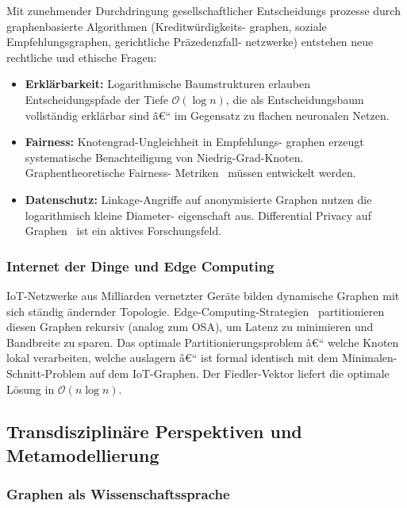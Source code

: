 ﻿\documentclass[12pt,a4paper,twoside]{article}
\theoremstyle{definition}
\theoremstyle{plain}
\theoremstyle{remark}
\begin{document}
Mit zunehmender Durchdringung gesellschaftlicher Entscheidungs\-
prozesse durch graphenbasierte Algorithmen (Kreditwürdigkeits-
graphen, soziale Empfehlungsgraphen, gerichtliche Präzedenzfall-
netzwerke) entstehen neue rechtliche und ethische Fragen:
\begin{itemize}
  \item \textbf{Erklärbarkeit:} Logarithmische Baumstrukturen
        erlauben Entscheidungspfade der Tiefe $\mathcal{O}(\log n)$,
        die als Entscheidungsbaum vollständig erklärbar sind â€“
        im Gegensatz zu flachen neuronalen Netzen.
  \item \textbf{Fairness:} Knotengrad-Ungleichheit in Empfehlungs-
        graphen erzeugt systematische Benachteiligung von
        Niedrig-Grad-Knoten.  Graphentheoretische Fairness-
        Metriken~\cite{Saxena2022} müssen entwickelt werden.
  \item \textbf{Datenschutz:} Linkage-Angriffe auf anonymisierte
        Graphen nutzen die logarithmisch kleine Diameter-
        eigenschaft aus.  Differential Privacy auf Graphen~\cite{Hay2009}
        ist ein aktives Forschungsfeld.
\end{itemize}

\subsubsection{Internet der Dinge und Edge Computing}

IoT-Netzwerke aus Milliarden vernetzter Geräte bilden
dynamische Graphen mit sich ständig ändernder Topologie.
Edge-Computing-Strategien~\cite{Shi2016} partitionieren
diesen Graphen rekursiv (analog zum OSA), um Latenz zu
minimieren und Bandbreite zu sparen.  Das optimale
Partitionierungsproblem â€“ welche Knoten lokal verarbeiten,
welche auslagern â€“ ist formal identisch mit dem
Minimalen-Schnitt-Problem auf dem IoT-Graphen.
Der Fiedler-Vektor liefert die optimale Lösung in
$\mathcal{O}(n \log n)$.

\subsection{Transdisziplinäre Perspektiven und Metamodellierung}
\label{sub:meta}

\subsubsection{Graphen als Wissenschaftssprache}
\end{document}
